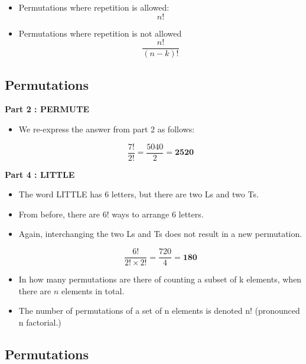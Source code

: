 \documentclass[]{report}
\begin{document}
	
	
	\begin{framed}
		\begin{itemize}
			\item Permutations where repetition is allowed: 
			\[ n! \]
			\item Permutations where repetition is not allowed
			\[ \frac{n!}{(n-k)!} \]
		\end{itemize}
	\end{framed}
	
	
	
	
	\subsection{Permutations}
	
	
	\textbf{Part 2 : PERMUTE}\\
	\begin{itemize}
		\item We re-express the answer from part 2 as follows:
		
		\[\frac{7!}{2!} =  \frac{5040}{2} = \boldsymbol{2520} \]
	\end{itemize}
	
	\textbf{Part 4 : LITTLE}\\
	\begin{itemize}
		\item The word LITTLE has 6 letters, but there are two Ls and two Ts.
		\item From before, there are 6! ways to arrange 6 letters.
		\item Again, interchanging the two Ls and Ts does not result in a new permutation. 
		
		\[\frac{6!}{2!\times 2!} =  \frac{720}{4} = \boldsymbol{180} \]
	\end{itemize}
	
	\begin{itemize}
		\item In how many permutations are there of counting a subset of k elements, when there are $n$ elements in total.
		
		\item The number of permutations of a set of n elements is denoted n! (pronounced n factorial.)
	\end{itemize}
	
	\subsection{Permutations}
	
\end{document}
